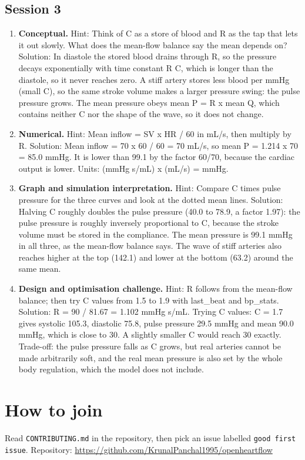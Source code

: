 \documentclass[11pt,a4paper]{article}
\begin{document}
\subsection*{Session 3}
\begin{enumerate}[nosep]
\item \textbf{Conceptual.} Hint: Think of C as a store of blood and R as the tap that lets it out slowly. What does the mean-flow balance say the mean depends on? Solution: In diastole the stored blood drains through R, so the pressure decays exponentially with time constant R C, which is longer than the diastole, so it never reaches zero. A stiff artery stores less blood per mmHg (small C), so the same stroke volume makes a larger pressure swing: the pulse pressure grows. The mean pressure obeys mean P = R x mean Q, which contains neither C nor the shape of the wave, so it does not change.
\item \textbf{Numerical.} Hint: Mean inflow = SV x HR / 60 in mL/s, then multiply by R. Solution: Mean inflow = 70 x 60 / 60 = 70 mL/s, so mean P = 1.214 x 70 = 85.0 mmHg. It is lower than 99.1 by the factor 60/70, because the cardiac output is lower. Units: (mmHg s/mL) x (mL/s) = mmHg.
\item \textbf{Graph and simulation interpretation.} Hint: Compare C times pulse pressure for the three curves and look at the dotted mean lines. Solution: Halving C roughly doubles the pulse pressure (40.0 to 78.9, a factor 1.97): the pulse pressure is roughly inversely proportional to C, because the stroke volume must be stored in the compliance. The mean pressure is 99.1 mmHg in all three, as the mean-flow balance says. The wave of stiff arteries also reaches higher at the top (142.1) and lower at the bottom (63.2) around the same mean.
\item \textbf{Design and optimisation challenge.} Hint: R follows from the mean-flow balance; then try C values from 1.5 to 1.9 with last\_beat and bp\_stats. Solution: R = 90 / 81.67 = 1.102 mmHg s/mL. Trying C values: C = 1.7 gives systolic 105.3, diastolic 75.8, pulse pressure 29.5 mmHg and mean 90.0 mmHg, which is close to 30. A slightly smaller C would reach 30 exactly. Trade-off: the pulse pressure falls as C grows, but real arteries cannot be made arbitrarily soft, and the real mean pressure is also set by the whole body regulation, which the model does not include.
\end{enumerate}

\section{How to join}
Read \texttt{CONTRIBUTING.md} in the repository, then pick an issue labelled \texttt{good first issue}. Repository: \url{https://github.com/KrunalPanchal1995/openheartflow}
\end{document}
